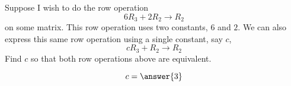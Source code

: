 \documentclass{ximera}
\begin{document}
\begin{exercise}
  Suppose I wish to do the row operation
  \[
    6R_3 + 2R_2 \to R_2
  \]
  on some matrix.
  This row operation uses two constants, $6$ and $2$.  We can also
  express this same row operation using a single constant, say $c$,
  \[
  c R_3 +R_2 \to R_2
  \]
  Find $c$ so that both row operations above are equivalent.
  \begin{prompt}
  \[
  c=\answer{3}
  \]
  \end{prompt}
\end{exercise}
\end{document}
